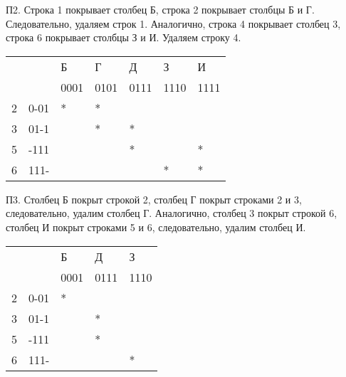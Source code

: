 \documentclass{article}
\begin{document}
	П2. Строка 1 покрывает столбец Б, строка 2 покрывает столбцы Б и Г. Следовательно, удаляем строк 1.
	Аналогично, строка 4 покрывает столбец 3, строка 6 покрывает столбцы З и И. Удаляем строку 4.
	
	\newpage
	
	\begin{table}[ht]
		\centering
		\begin{tabular}{|ll|l|l|l|l|l|}
			\hline
			\multicolumn{2}{|l|}{\multirow{2}{*}{}} & Б    & Г    & Д    & З    & И    \\ \cline{3-7} 
			\multicolumn{2}{|l|}{}                  & 0001 & 0101 & 0111 & 1110 & 1111 \\ \hline
			\multicolumn{1}{|l|}{2}      & 0-01     & *    & *    &      &      &      \\ \hline
			\multicolumn{1}{|l|}{3}      & 01-1     &      & *    & *    &      &      \\ \hline
			\multicolumn{1}{|l|}{5}      & -111     &      &      & *    &      & *    \\ \hline
			\multicolumn{1}{|l|}{6}      & 111-     &      &      &      & *    & *    \\ \hline
		\end{tabular}
	\end{table}
	
	П3. Столбец Б покрыт строкой 2, столбец Г покрыт строками 2 и 3, следовательно, удалим столбец Г.
	Аналогично, столбец 3 покрыт строкой 6, столбец И покрыт строками 5 и 6, следовательно, удалим
	столбец И.
	
	\begin{table}[ht]
		\centering
		\begin{tabular}{|ll|l|l|l|}
			\hline
			\multicolumn{2}{|l|}{\multirow{2}{*}{}} & Б    & Д    & З    \\ \cline{3-5} 
			\multicolumn{2}{|l|}{}                  & 0001 & 0111 & 1110 \\ \hline
			\multicolumn{1}{|l|}{2}      & 0-01     & *    &      &      \\ \hline
			\multicolumn{1}{|l|}{3}      & 01-1     &      & *    &      \\ \hline
			\multicolumn{1}{|l|}{5}      & -111     &      & *    &      \\ \hline
			\multicolumn{1}{|l|}{6}      & 111-     &      &      & *    \\ \hline
		\end{tabular}
	\end{table}
	
\end{document}
